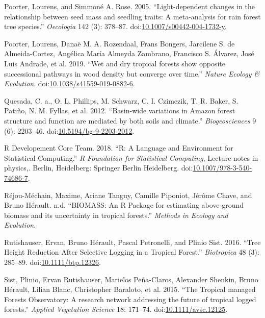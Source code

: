 \documentclass[]{elsarticle} %
\begin{document}
\hypertarget{ref-Poorter2005a}{}
Poorter, Lourens, and Simmoné A. Rose. 2005. ``Light-dependent changes
in the relationship between seed mass and seedling traits: A
meta-analysis for rain forest tree species.'' \emph{Oecologia} 142 (3):
378--87.
doi:\href{https://doi.org/10.1007/s00442-004-1732-y}{10.1007/s00442-004-1732-y}.

\hypertarget{ref-Poorter2019}{}
Poorter, Lourens, Danaë M. A. Rozendaal, Frans Bongers, Jarcilene S. de
Almeida-Cortez, Angélica María Almeyda Zambrano, Francisco S. Álvarez,
José Luís Andrade, et al. 2019. ``Wet and dry tropical forests show
opposite successional pathways in wood density but converge over time.''
\emph{Nature Ecology \& Evolution}.
doi:\href{https://doi.org/10.1038/s41559-019-0882-6}{10.1038/s41559-019-0882-6}.

\hypertarget{ref-Quesada2012}{}
Quesada, C. a., O. L. Phillips, M. Schwarz, C. I. Czimczik, T. R. Baker,
S. Patiño, N. M. Fyllas, et al. 2012. ``Basin-wide variations in Amazon
forest structure and function are mediated by both soils and climate.''
\emph{Biogeosciences} 9 (6): 2203--46.
doi:\href{https://doi.org/10.5194/bg-9-2203-2012}{10.5194/bg-9-2203-2012}.

\hypertarget{ref-RDevelopementTeam2018}{}
R Developement Core Team. 2018. ``R: A Language and Environment for
Statistical Computing.'' \emph{R Foundation for Statistical Computing},
Lecture notes in physics,. Berlin, Heidelberg: Springer Berlin
Heidelberg.
doi:\href{https://doi.org/10.1007/978-3-540-74686-7}{10.1007/978-3-540-74686-7}.

\hypertarget{ref-Rejou-Mechain2017}{}
Réjou-Méchain, Maxime, Ariane Tanguy, Camille Piponiot, Jérôme Chave,
and Bruno Hérault. n.d. ``BIOMASS: An R Package for estimating
above-ground biomass and its uncertainty in tropical forests.''
\emph{Methods in Ecology and Evolution}.

\hypertarget{ref-Rutishauser2016}{}
Rutishauser, Ervan, Bruno Hérault, Pascal Petronelli, and Plinio Sist.
2016. ``Tree Height Reduction After Selective Logging in a Tropical
Forest.'' \emph{Biotropica} 48 (3): 285--89.
doi:\href{https://doi.org/10.1111/btp.12326}{10.1111/btp.12326}.

\hypertarget{ref-Sist2015}{}
Sist, Plinio, Ervan Rutishauser, Marielos Peña-Claros, Alexander
Shenkin, Bruno Hérault, Lilian Blanc, Christopher Baraloto, et al. 2015.
``The Tropical managed Forests Observatory: A research network
addressing the future of tropical logged forests.'' \emph{Applied
Vegetation Science} 18: 171--74.
doi:\href{https://doi.org/10.1111/avsc.12125}{10.1111/avsc.12125}.
\end{document}
